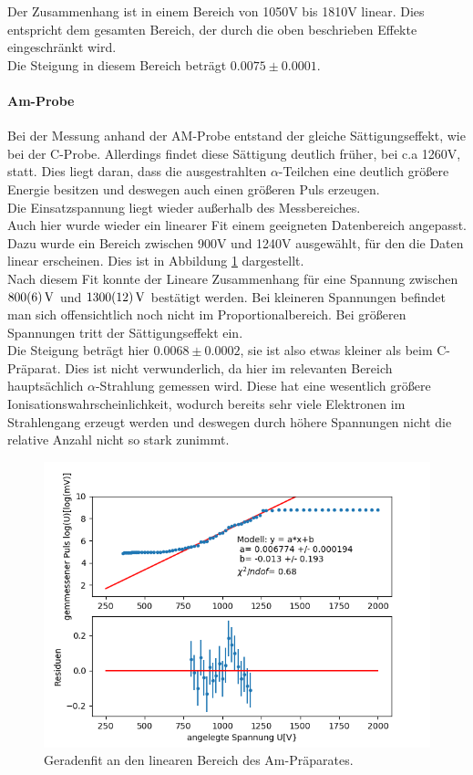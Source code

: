 \documentclass[12pt,a4paper]{article}
\begin{document}
Der Zusammenhang ist in einem Bereich von 1050V bis 1810V linear. Dies entspricht dem gesamten Bereich, der durch die oben beschrieben Effekte eingeschränkt wird.\\
Die Steigung in diesem Bereich beträgt $0.0075\pm 0.0001$.

\paragraph{Am-Probe}
Bei der Messung anhand der AM-Probe entstand der gleiche Sättigungseffekt, wie bei der C-Probe. Allerdings findet diese Sättigung deutlich früher, bei c.a 1260V, statt. Dies liegt daran, dass die ausgestrahlten $\alpha$-Teilchen eine deutlich größere Energie besitzen und deswegen auch einen größeren Puls erzeugen.\\
Die Einsatzspannung liegt wieder außerhalb des Messbereiches.\\
Auch hier wurde wieder ein linearer Fit einem geeigneten Datenbereich angepasst. Dazu wurde ein Bereich zwischen 900V und 1240V ausgewählt, für den die Daten linear erscheinen. Dies ist in Abbildung \ref{fig:AMPulsfit} dargestellt.\\
Nach diesem Fit konnte der Lineare Zusammenhang für eine Spannung zwischen $\SI{800\pm 6}{V}$ und $\SI{1300\pm 12}{V}$ bestätigt werden. Bei kleineren Spannungen befindet man sich offensichtlich noch nicht im Proportionalbereich. Bei größeren Spannungen tritt der Sättigungseffekt ein.\\
Die Steigung beträgt hier $0.0068\pm 0.0002$, sie ist also etwas kleiner als beim C-Präparat. Dies ist nicht verwunderlich, da hier im relevanten Bereich hauptsächlich $\alpha$-Strahlung gemessen wird. Diese hat eine wesentlich größere Ionisationswahrscheinlichkeit, wodurch bereits sehr viele Elektronen im Strahlengang erzeugt werden und deswegen durch höhere Spannungen nicht die relative Anzahl nicht so stark zunimmt.



\begin{figure}
\centering
\includegraphics[scale=0.8]{Bilder/Prop/AM_Pulsfit.PNG}
\caption{Geradenfit an den linearen Bereich des Am-Präparates.}
\label{fig:AMPulsfit}
\end{figure}
\newpage
\end{document}
